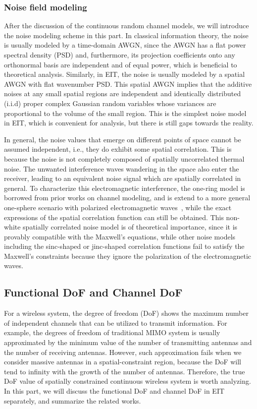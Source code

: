 \documentclass[journal,twocolumn]{IEEEtran}
\begin{document}
\subsubsection{Noise field modeling}
After the discussion of the continuous random channel models, we will introduce the noise modeling scheme in this part. In classical information theory, the noise is usually modeled by a time-domain AWGN, since the AWGN has a flat power spectral density (PSD) and, furthermore, its projection coefficients onto any orthonormal basis are independent and of equal power, which is beneficial to theoretical analysis. 
Similarly, in EIT, the noise is usually modeled by a spatial AWGN with flat wavenumber PSD. This spatial AWGN implies that the additive noises at any small spatial regions are independent and identically distributed (i.i.d) proper complex Gaussian random variables whose variances are proportional to the volume of the small region. This is the simplest noise model in EIT, which is convenient for analysis, but there is still gaps towards the reality. 

In general, the noise values that emerge on different points of space cannot be assumed independent, i.e., they do exhibit some spatial correlation. 
This is because the noise is not completely composed of spatially uncorrelated thermal noise. 
The unwanted interference waves wandering in the space also enter the receiver, leading to an equivalent noise signal which are spatially correlated in general. 
To characterize this electromagnetic interference, the one-ring model is borrowed from prior works on channel modeling, and is extend to a more general one-sphere scenario with polarized electromagnetic waves~\cite{wan2022mutual}, while the exact expressions of the spatial correlation function can still be obtained. 
This non-white spatially correlated noise model is of theoretical importance, since it is provably compatible with the Maxwell's equations, while other noise models including the sinc-shaped or jinc-shaped correlation functions fail to satisfy the Maxwell's constraints because they ignore the polarization of the electromagnetic waves. 


\subsection{Functional DoF and Channel DoF}
\label{Sec_3_Subsec_2}
For a wireless system, the degree of freedom (DoF) shows the maximum number of independent channels that can be utilized to transmit information. For example, the degrees of freedom of traditional MIMO system is usually approximated by the minimum value of the number of transmitting antennas and the number of receiving antennas. However, such approximation fails when we consider massive antennas in a spatial-constraint region, because the DoF will tend to infinity with the growth of the number of antennas. Therefore, the true DoF value of spatially constrained continuous wireless system is worth analyzing. In this part, we will discuss the functional DoF and channel DoF in EIT separately, and summarize the related works.
\end{document}

